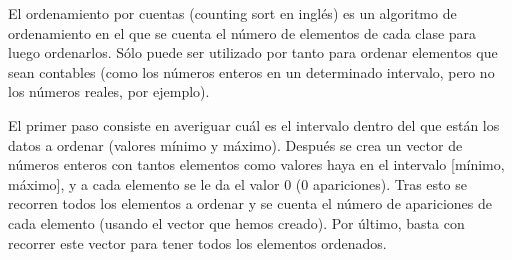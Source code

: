 El ordenamiento por cuentas (counting sort en inglés) es un algoritmo de ordenamiento en el que se cuenta el número de elementos de cada clase para luego ordenarlos. Sólo puede ser utilizado por tanto para ordenar elementos que sean contables (como los números enteros en un determinado intervalo, pero no los números reales, por ejemplo).

El primer paso consiste en averiguar cuál es el intervalo dentro del que están los datos a ordenar (valores mínimo y máximo). Después se crea un vector de números enteros con tantos elementos como valores haya en el intervalo [mínimo, máximo], y a cada elemento se le da el valor 0 (0 apariciones). Tras esto se recorren todos los elementos a ordenar y se cuenta el número de apariciones de cada elemento (usando el vector que hemos creado). Por último, basta con recorrer este vector para tener todos los elementos ordenados.